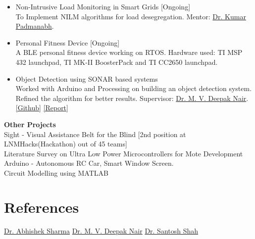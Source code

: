 \documentclass[]{friggeri-cv}
\begin{document}
\begin{itemize}
    \item Non-Intrusive Load Monitoring in Smart Grids [Ongoing]\\
    {\small To Implement NILM algorithms for load desegregation. Mentor: \href{http://www.lnmiit.ac.in/Department/CSE/Department_FacultyProfile.aspx?nDeptID=20296}{Dr. Kumar Padmanabh}.}
    \item Personal Fitness Device [Ongoing]\\
    {\small A BLE personal fitness device working on RTOS. Hardware used: TI MSP 432 launchpad, TI MK-II BoosterPack and TI CC2650 launchpad.}
    \item Object Detection using SONAR based systems\\
    {\small Worked with Arduino and Processing on building an object detection system. Refined the algorithm for better results. Supervisor: \href{http://www.lnmiit.ac.in/Department/ECE/ece_FacultyProfile.aspx?nDeptID=20269}{Dr. M. V. Deepak Nair}. \href{https://github.com/suryabvsp/sonar-project}{[Github]} \href{https://github.com/suryabvsp/sonar-project/blob/master/Sonar%20Project%20Report.pdf}{[Report]}}
\end{itemize}
\textbf{Other Projects}\\
    {\small Sight - Visual Assistance Belt for the Blind [2nd position at LNMHacks(Hackathon) out of 45 teams]\\
    Literature Survey on Ultra Low Power Microcontrollers for Mote Development\\
    Arduino - Autonomous RC Car, Smart Window Screen.\\Circuit Modelling using MATLAB}
\section{References}
\href{http://lnmiit.ac.in/Department/ECE/ece_FacultyProfile.aspx?nDeptID=119}{Dr. Abhishek Sharma} \qquad \href{http://www.lnmiit.ac.in/Department/ECE/ece_FacultyProfile.aspx?nDeptID=20269}{Dr. M. V. Deepak Nair} \qquad \href{http://www.lnmiit.ac.in/Department/ECE/ece_FacultyProfile.aspx?nDeptID=189}{Dr. Santosh Shah}
% 
\end{document}
